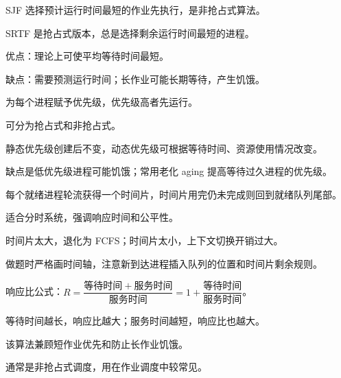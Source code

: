 \begin{points}
  \item SJF 选择预计运行时间最短的作业先执行，是非抢占式算法。
  \item SRTF 是抢占式版本，总是选择剩余运行时间最短的进程。
  \item 优点：理论上可使平均等待时间最短。
  \item 缺点：需要预测运行时间；长作业可能长期等待，产生饥饿。
\end{points}


\begin{points}
  \item 为每个进程赋予优先级，优先级高者先运行。
  \item 可分为抢占式和非抢占式。
  \item 静态优先级创建后不变，动态优先级可根据等待时间、资源使用情况改变。
  \item 缺点是低优先级进程可能饥饿；常用老化 aging 提高等待过久进程的优先级。
\end{points}


\begin{points}
  \item 每个就绪进程轮流获得一个时间片，时间片用完仍未完成则回到就绪队列尾部。
  \item 适合分时系统，强调响应时间和公平性。
  \item 时间片太大，退化为 FCFS；时间片太小，上下文切换开销过大。
  \item 做题时严格画时间轴，注意新到达进程插入队列的位置和时间片剩余规则。
\end{points}


\begin{points}
  \item 响应比公式：$R=\dfrac{等待时间+服务时间}{服务时间}=1+\dfrac{等待时间}{服务时间}$。
  \item 等待时间越长，响应比越大；服务时间越短，响应比也越大。
  \item 该算法兼顾短作业优先和防止长作业饥饿。
  \item 通常是非抢占式调度，用在作业调度中较常见。
\end{points}


